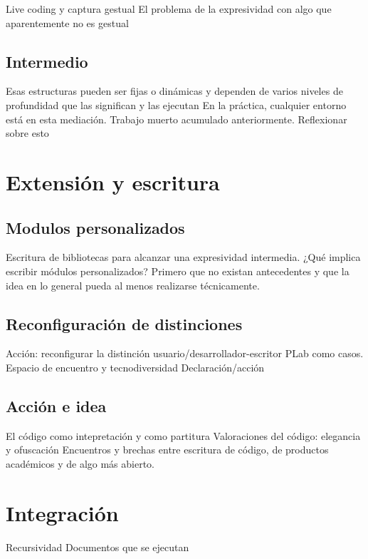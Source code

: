 \documentclass[12pt,a4paper, openright,
headinclude,footinclude,BCOR5mm,
numbers=noenddot,cleardoublepage=empty,
tablecaptionabove]{article}
\begin{document}
Live coding y captura gestual 
El problema de la expresividad con algo que aparentemente no es gestual 

\subsection{Intermedio}

Esas estructuras pueden ser fijas o dinámicas y dependen de varios niveles de profundidad que las significan y las ejecutan
En la práctica, cualquier entorno está en esta mediación. Trabajo muerto acumulado anteriormente. Reflexionar sobre esto

\section{Extensión y escritura}

\subsection{Modulos personalizados}

Escritura de bibliotecas para alcanzar una expresividad intermedia.
¿Qué implica escribir módulos personalizados?
Primero que no existan antecedentes y que la idea en lo general pueda al menos realizarse técnicamente.

\subsection{Reconfiguración de distinciones}

Acción: reconfigurar la distinción usuario/desarrollador-escritor
PLab como casos. Espacio de encuentro y tecnodiversidad
Declaración/acción

\subsection{Acción e idea}

El código como intepretación y como partitura
Valoraciones del código: elegancia y ofuscación
Encuentros y brechas entre escritura de código, de productos académicos y de algo más abierto.

\section{Integración}

Recursividad
Documentos que se ejecutan 

\end{document}
